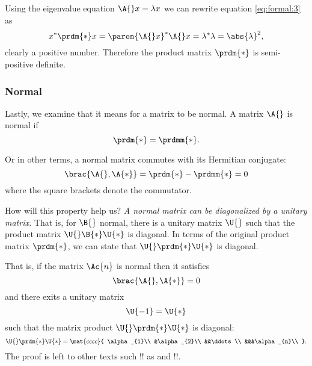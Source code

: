 Using the eigenvalue equation $\A{}x=\lambda x$ we can rewrite equation \eqref{eq:formal:3} as
\begin{equation}
  x^{*}\prdm{*}x  =  \paren{\A{}x}^{*}\A{}x  =  \lambda^{*}\lambda = \abs{\lambda}^{2},
\end{equation}
clearly a positive number. Therefore the product matrix $\prdm{*}$ is semi-positive definite.


\subsubsection{Normal}

Lastly, we examine that it means for a matrix to be normal. A matrix $\A{}$ is normal if
\begin{equation}
  \prdm{*}  =  \prdmm{*}.
\end{equation}

Or in other terms, a normal matrix commutes with its Hermitian conjugate: 
\begin{equation}
  \brac{ \A{}, \A{*} } = \prdm{*}-\prdmm{*} =  0
\end{equation}
where the square brackets denote the commutator.

How will this property help us? \textit{A normal matrix can be diagonalized by a unitary matrix.} That is, for $\B{}$ normal, there is a unitary matrix $\U{}$ such that the product matrix $\U{}\B{*}\U{*}$ is diagonal. In terms of the original product matrix $\prdm{*}$, we can state that $\U{}\prdm{*}\U{*}$ is diagonal. 

That is, if the matrix $\Ac{n}$ is normal then it satisfies
\begin{equation}
  \brac{ \A{}, \A{*} } = 0
\end{equation}
and there exits a unitary matrix
\begin{equation}
  \U{-1}  =  \U{*}
\end{equation}
such that the matrix product $\U{}\prdm{*}\U{*}$ is diagonal:
\begin{equation}
  \U{}\prdm{*}\U{*} = \mat{cccc}
  {
  \alpha_{1}\\
  &\alpha_{2}\\
  &&\ddots\\
  &&&\alpha_{n}\\
  }.
\end{equation}
The proof is left to other texts such !! as and !!.

